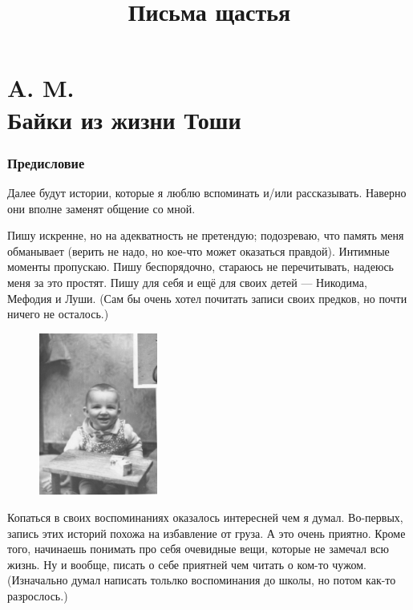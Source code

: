 \documentclass{book}
\begin{document}

\title{Письма щастья}
\author{}
\date{}
\maketitle
\thispagestyle{empty}

\part*{A. M.\\
Байки из жизни Тоши}


\section*{Предисловие}

Далее будут истории, которые я люблю вспоминать и/или рассказывать.
Наверно они вполне заменят общение со мной.

Пишу искренне, но на адекватность не претендую; 
подозреваю, что память меня обманывает (верить не надо, но кое-что может оказаться правдой).
Интимные моменты пропускаю.
Пишу беспорядочно, стараюсь не перечитывать, надеюсь меня за это простят.
Пишу для себя и ещё для своих детей --- Никодима, Мефодия и Луши.
(Сам бы очень хотел почитать записи своих предков, но почти ничего не осталось.)

\begin{figure}
\vskip-4mm
\centering
\includegraphics[width=39mm,angle=0]{pics/tosha-taburetocka}
\end{figure}

Копаться в своих воспоминаниях оказалось интересней чем я думал.
Во-первых, запись этих историй похожа на избавление от груза. 
А это очень приятно.
Кроме того, начинаешь понимать про себя очевидные вещи, которые не замечал всю жизнь.
Ну и вообще, писать о себе приятней чем читать о ком-то чужом.
(Изначально думал написать тольлко воспоминания до школы, но потом как-то разрослось.)
\end{document}
